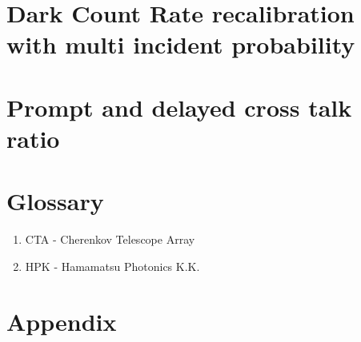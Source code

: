 \documentclass[12pt,article,type=msc,colorback,accentcolor=tud9c]{tudthesis}
\begin{document}


\section{Dark Count Rate recalibration with multi incident probability}

\section{Prompt and delayed cross talk ratio}



\newpage
\section{Glossary}
\begin{enumerate}
\item CTA - Cherenkov Telescope Array
\item HPK - Hamamatsu Photonics K.K.
\end{enumerate}





\newpage
\section{Appendix}
\end{document}
